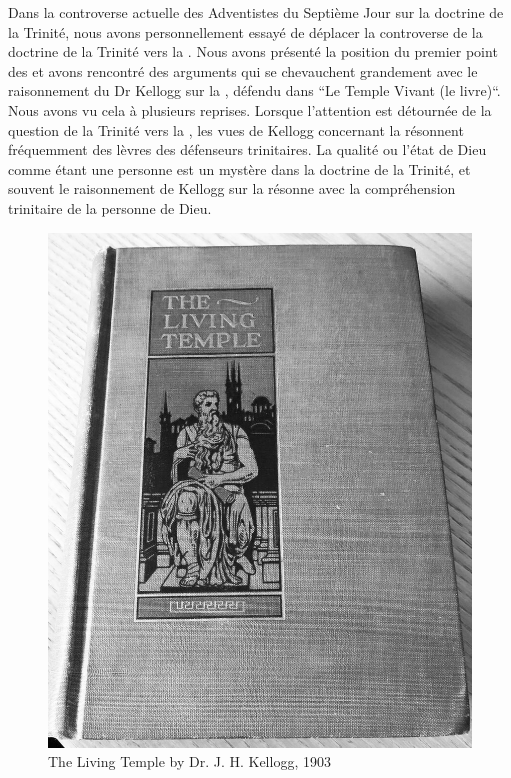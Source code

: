 Dans la controverse actuelle des Adventistes du Septième Jour sur la doctrine de la Trinité, nous avons personnellement essayé de déplacer la controverse de la doctrine de la Trinité vers la . Nous avons présenté la position du premier point des  et avons rencontré des arguments qui se chevauchent grandement avec le raisonnement du Dr Kellogg sur la , défendu dans “Le Temple Vivant (le livre)“. Nous avons vu cela à plusieurs reprises. Lorsque l'attention est détournée de la question de la Trinité vers la , les vues de Kellogg concernant la  résonnent fréquemment des lèvres des défenseurs trinitaires. La qualité ou l'état de Dieu comme étant une personne est un mystère dans la doctrine de la Trinité, et souvent le raisonnement de Kellogg sur la  résonne avec la compréhension trinitaire de la personne de Dieu.


\begin{figure}[hp]
    \centering
    \includegraphics[width=1\linewidth]{images/TLT.jpg}
    \caption*{The Living Temple by Dr. J. H. Kellogg, 1903}
    \label{fig:tlt}
\end{figure}


